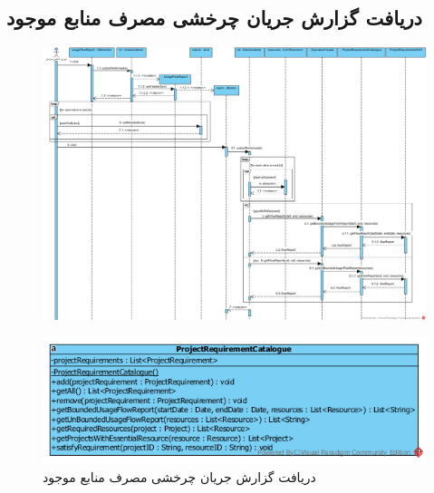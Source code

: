 \begin{landscape}
\newpage
\section{دریافت گزارش جریان چرخشی مصرف منابع موجود}
\begin{figure}[H]
	\centering
	\includegraphics[scale=0.55]{img/sequence-design/UsageFlowReport}
\end{figure}
\begin{figure}[H]
	\centering
	\includegraphics[scale=0.7]{img/sequence-design/UsageFlowReportC}
	\caption{دریافت گزارش جریان چرخشی مصرف منابع موجود}
\end{figure}

\newpage

\end{landscape}

